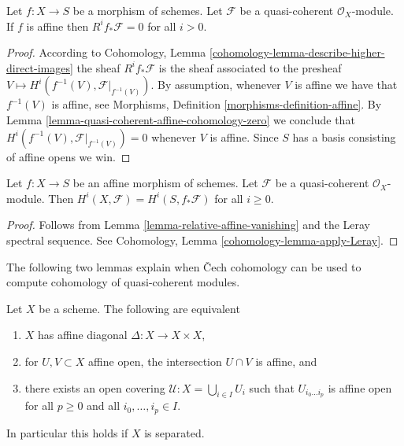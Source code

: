 \begin{lemma}
\label{lemma-relative-affine-vanishing}
Let $f : X \to S$ be a morphism of schemes.
Let $\mathcal{F}$ be a quasi-coherent $\mathcal{O}_X$-module.
If $f$ is affine then $R^if_*\mathcal{F} = 0$ for all $i > 0$.
\end{lemma}

\begin{proof}
According to
Cohomology, Lemma \ref{cohomology-lemma-describe-higher-direct-images}
the sheaf
$R^if_*\mathcal{F}$ is the sheaf associated to the presheaf
$V \mapsto H^i(f^{-1}(V), \mathcal{F}|_{f^{-1}(V)})$.
By assumption, whenever $V$ is affine we have that $f^{-1}(V)$ is
affine, see Morphisms, Definition \ref{morphisms-definition-affine}.
By Lemma \ref{lemma-quasi-coherent-affine-cohomology-zero} we conclude that
$H^i(f^{-1}(V), \mathcal{F}|_{f^{-1}(V)}) = 0$
whenever $V$ is affine. Since $S$ has a basis consisting of affine
opens we win.
\end{proof}

\begin{lemma}
\label{lemma-relative-affine-cohomology}
Let $f : X \to S$ be an affine morphism of schemes.
Let $\mathcal{F}$ be a quasi-coherent $\mathcal{O}_X$-module.
Then $H^i(X, \mathcal{F}) = H^i(S, f_*\mathcal{F})$ for all $i \geq 0$.
\end{lemma}

\begin{proof}
Follows from Lemma \ref{lemma-relative-affine-vanishing}
and the Leray spectral sequence. See
Cohomology, Lemma \ref{cohomology-lemma-apply-Leray}.
\end{proof}

\noindent
The following two lemmas explain when {\v C}ech cohomology
can be used to compute cohomology of quasi-coherent modules.

\begin{lemma}
\label{lemma-affine-diagonal}
Let $X$ be a scheme. The following are equivalent
\begin{enumerate}
\item $X$ has affine diagonal $\Delta : X \to X \times X$,
\item for $U, V \subset X$ affine open, the intersection
$U \cap V$ is affine, and
\item there exists an open covering $\mathcal{U} : X = \bigcup_{i \in I} U_i$
such that $U_{i_0 \ldots i_p}$ is affine open for all $p \ge 0$ and all
$i_0, \ldots, i_p \in I$.
\end{enumerate}
In particular this holds if $X$ is separated.
\end{lemma}

